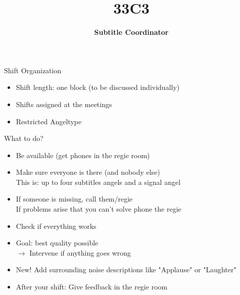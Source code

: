 \documentclass[utf8,widescreen]{beamer}
\title{\Huge \textbf{33C3}}
\subtitle{{\Large \textbf{Subtitle Coordinator}}\\}
\date{}
\begin{document}
\begin{frame}{\titlepage}
\end{frame}

\begin{frame}{Shift Organization}
\pause
\begin{block}{}
\begin{itemize}\itemsep 14pt
\item{Shift length: one block (to be discussed individually)}
\pause
\item{Shifts assigned at the meetings}
\pause
\item{Restricted Angeltype}
\end{itemize}
\end{block}
\end{frame}

\begin{frame}{What to do?}
\pause
\begin{block}{}
\begin{itemize}\itemsep 12pt
\item{Be available (get phones in the regie room)}
\pause
\item{Make sure everyone is there (and nobody else)\\
This is: up to four subtitles angels and a signal angel}
\pause
\item{If someone is missing, call them/regie\\
If problems arise that you can't solve phone the regie}
\pause
\item{Check if everything works}
\pause
\item{Goal: best quality possible\\
\pause
$\rightarrow$ Intervene if anything goes wrong}
\pause
\item{{\color{red}New!} Add surrounding noise descriptions like "Applause" or "Laughter"}
\pause
\item{After your shift: Give feedback in the regie room}
\end{itemize}
\end{block}
\end{frame}
\end{document}
